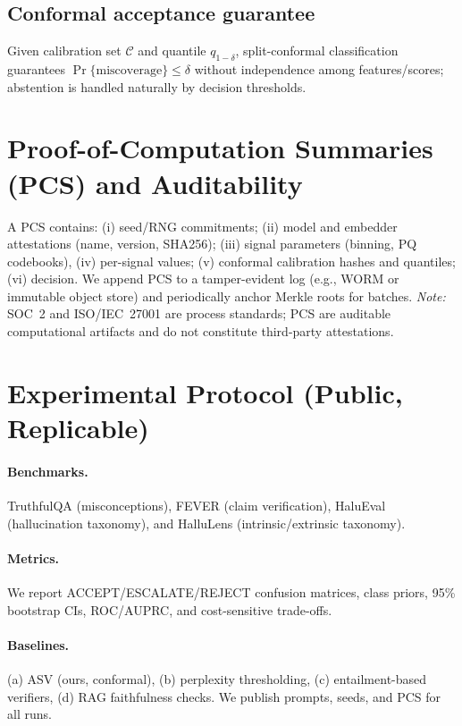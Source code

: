 \documentclass[11pt]{article}
\begin{document}
\subsection{Conformal acceptance guarantee}
Given calibration set $\mathcal{C}$ and quantile $q_{1-\delta}$, split-conformal classification guarantees $\Pr\{\text{miscoverage}\}\le\delta$ without independence among features/scores; abstention is handled naturally by decision thresholds.

\section{Proof-of-Computation Summaries (PCS) and Auditability}
A PCS contains: (i) seed/RNG commitments; (ii) model and embedder attestations (name, version, SHA256); (iii) signal parameters (binning, PQ codebooks), (iv) per-signal values; (v) conformal calibration hashes and quantiles; (vi) decision. We append PCS to a tamper-evident log (e.g., WORM or immutable object store) and periodically anchor Merkle roots for batches. \emph{Note:} SOC~2 and ISO/IEC~27001 are process standards; PCS are auditable computational artifacts and do not constitute third-party attestations.

\section{Experimental Protocol (Public, Replicable)}
\paragraph{Benchmarks.} TruthfulQA (misconceptions), FEVER (claim verification), HaluEval (hallucination taxonomy), and HalluLens (intrinsic/extrinsic taxonomy).
\paragraph{Metrics.} We report \textsc{ACCEPT}/\textsc{ESCALATE}/\textsc{REJECT} confusion matrices, class priors, 95\% bootstrap CIs, ROC/AUPRC, and cost-sensitive trade-offs.
\paragraph{Baselines.} (a) ASV (ours, conformal), (b) perplexity thresholding, (c) entailment-based verifiers, (d) RAG faithfulness checks. We publish prompts, seeds, and PCS for all runs.
\end{document}

